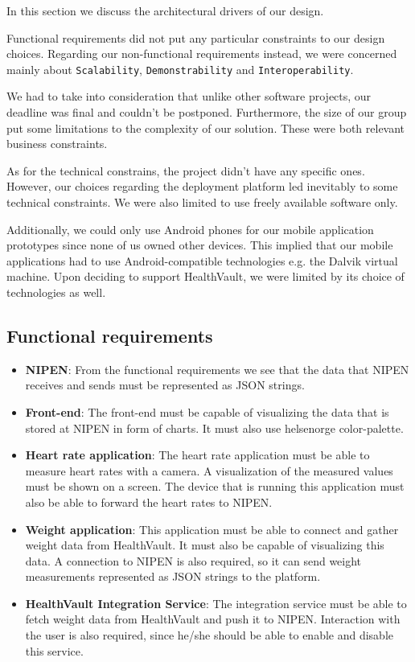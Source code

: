 In this section we discuss the architectural drivers of our design.

Functional requirements did not put any particular constraints to our design choices.
Regarding our non-functional requirements instead, we were concerned mainly about
\verb|Scalability|, \verb|Demonstrability| and \verb|Interoperability|.

We had to take into consideration that unlike other software projects, our deadline was final
and couldn't be postponed. Furthermore, the size of our group put some limitations
to the complexity of our solution. These were both relevant business constraints.

As for the technical constrains, the project didn't have any specific ones.
However, our choices regarding the deployment platform led inevitably to some technical
constraints. We were also limited to use freely available software only.

Additionally, we could only use Android phones for our mobile application prototypes
since none of us owned other devices. This implied that our mobile applications
had to use Android-compatible technologies e.g. the Dalvik virtual machine.
Upon deciding to support HealthVault, we were limited by its choice of
technologies as well.

\iffalse
\subsection{Functional requirements}

\begin{itemize}
\item\textbf{NIPEN}: 
From the functional requirements we see that the data that NIPEN receives and sends must be represented as JSON strings.

\item\textbf{Front-end}: 
The front-end must be capable of visualizing the data that is stored at NIPEN in form of charts. 
It must also use helsenorge color-palette.

\item\textbf{Heart rate application}: 
The heart rate application must be able to measure heart rates with a camera. 
A visualization of the measured values must be shown on a screen.
The device that is running this application must also be able to forward the heart rates to NIPEN.

\item\textbf{Weight application}: 
This application must be able to connect and gather weight data from HealthVault.
It must also be capable of visualizing this data.
A connection to NIPEN is also required, so it can send weight measurements represented as JSON strings to the platform.

\item\textbf{HealthVault Integration Service}:
The integration service must be able to fetch weight data from HealthVault and push it to NIPEN.
Interaction with the user is also required, since he/she should be able to enable and disable this service.
\end{itemize}



